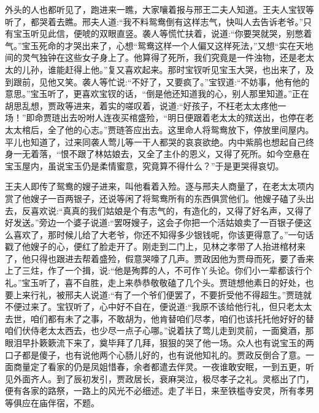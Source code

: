 \begin{parag}
    外头的人也都听见了，跑进来一瞧，大家嚷着报与邢王二夫人知道。王夫人宝钗等听了，都哭着去瞧。邢夫人道:“我不料鸳鸯倒有这样志气，快叫人去告诉老爷。”只有宝玉听见此信，便唬的双眼直竖。袭人等慌忙扶着，说道:“你要哭就哭，别憋着气。”宝玉死命的才哭出来了，心想“鸳鸯这样一个人偏又这样死法，”又想“实在天地间的灵气独钟在这些女子身上了。他算得了死所，我们究竟是一件浊物，还是老太太的儿孙，谁能赶得上他。”复又喜欢起来。那时宝钗听见宝玉大哭，也出来了，及到跟前，见他又笑。袭人等忙说:“不好了，又要疯了。”宝钗道:“不妨事，他有他的意思。”宝玉听了，更喜欢宝钗的话，“倒是他还知道我的心，别人那里知道。”正在胡思乱想，贾政等进来，着实的嗟叹着，说道:“好孩子，不枉老太太疼他一场！”即命贾琏出去吩咐人连夜买棺盛殓，“明日便跟着老太太的殡送出，也停在老太太棺后，全了他的心志。”贾琏答应出去。这里命人将鸳鸯放下，停放里间屋内。平儿也知道了，过来同袭人莺儿等一干人都哭的哀哀欲绝。内中紫鹃也想起自己终身一无着落，“恨不跟了林姑娘去，又全了主仆的恩义，又得了死所。如今空悬在宝玉屋内，虽说宝玉仍是柔情蜜意，究竟算不得什么？”于是更哭得哀切。
\end{parag}


\begin{parag}
    王夫人即传了鸳鸯的嫂子进来，叫他看着入殓。逐与邢夫人商量了，在老太太项内赏了他嫂子一百两银子，还说等闲了将鸳鸯所有的东西俱赏他们。他嫂子磕了头出去，反喜欢说:“真真的我们姑娘是个有志气的，有造化的，又得了好名声，又得了好发送。”旁边一个婆子说道:“罢呀嫂子，这会子你把一个活姑娘卖了一百银子便这么喜欢了，那时候儿给了大老爷，你还不知得多少银钱呢，你该更得意了。”一句话戳了他嫂子的心，便红了脸走开了。刚走到二门上，见林之孝带了人抬进棺材来了，他只得也跟进去帮着盛殓，假意哭嚎了几声。贾政因他为贾母而死，要了香来上了三炷，作了一个揖，说:“他是殉葬的人，不可作丫头论。你们小一辈都该行个礼。”宝玉听了，喜不自胜，走上来恭恭敬敬磕了几个头。贾琏想他素日的好处，也要上来行礼，被邢夫人说道:“有了一个爷们便罢了，不要折受他不得超生。”贾琏就不便过来了。宝钗听了，心中好不自在，便说道:“我原不该给他行礼，但只老太太去世，咱们都有未了之事，不敢胡为，他肯替咱们尽孝，咱们也该托托他好好的替咱们伏侍老太太西去，也少尽一点子心哪。”说着扶了莺儿走到灵前，一面奠酒，那眼泪早扑簌簌流下来了，奠毕拜了几拜，狠狠的哭了他一场。众人也有说宝玉的两口子都是傻子，也有说他两个心肠儿好的，也有说他知礼的。贾政反倒合了意。一面商量定了看家的仍是凤姐惜春，余者都遣去伴灵。一夜谁敢安眠，一到五更，听见外面齐人。到了辰初发引，贾政居长，衰麻哭泣，极尽孝子之礼。灵柩出了门，便有各家的路祭，一路上的风光不必细述。走了半日，来至铁槛寺安灵，所有孝男等俱应在庙伴宿，不题。
\end{parag}


